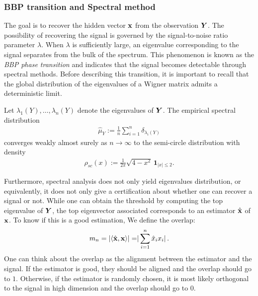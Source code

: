 \documentclass[11pt]{article}
\begin{document}
\subsubsection{ BBP transition and Spectral method} 

The goal is to recover the hidden vector $\boldsymbol{\mathbf{x}}$ from the observation $\bm{Y}$. The possibility of recovering the signal is governed by the signal-to-noise ratio parameter $\lambda$. When $\lambda$ is sufficiently large, an eigenvalue corresponding to the signal separates from the bulk of the spectrum. This phenomenon is known as the \emph{BBP phase transition} and indicates that the signal becomes detectable through spectral methods.
\noindent
Before describing this transition, it is important to recall that the global distribution of the eigenvalues of a Wigner matrix admits a deterministic limit.

\begin{theo}\label{thm:semi-circle}
Let $\lambda_1(Y),\dots,\lambda_n(Y)$ denote the eigenvalues of $\bm{Y}$. The empirical spectral distribution
\begin{align}
\hat{\mu}_Y := \frac{1}{n}\sum_{i=1}^n \delta_{\lambda_i(Y)}
\end{align}
converges weakly almost surely as $n \to \infty$ to the semi-circle distribution with density
\begin{align}
    \rho_{sc}(x) := \frac{1}{2\pi}\sqrt{4-x^2}\,\mathbf{1}_{|x|\le 2}.
\end{align}
\end{theo}


\noindent
Furthermore, spectral analysis does not only yield eigenvalues distribution, or equivalently, it does not only give a certification about whether one can recover a signal or not. 
\noindent
While one can obtain the threshold by computing the top eigenvalue of $\bm{Y}$, the top eigenvector associated corresponds to an estimator $\hat {\boldsymbol{\mathbf{x}}}$ of $\boldsymbol{\mathbf{x}}$. 
\noindent
To know if this is a good estimation, We define the overlap: 
\begin{equation}
    m_n = \lvert \langle \hat{\boldsymbol{\mathbf{x}}} 
     , \boldsymbol{\mathbf{x}}\rangle \rvert = \rvert\sum_{i=1}^n \hat{x}_i x_i \rvert \, .
    \label{eq:overlap_u}
\end{equation}
\noindent
One can think about the overlap as the alignment between the estimator and the signal. If the estimator is good, they should be aligned and the overlap should go to $1$. Otherwise, if the estimator is randomly chosen, it is most likely orthogonal to the signal in high dimension and the overlap should go to $0$.
\medskip 
\end{document}
